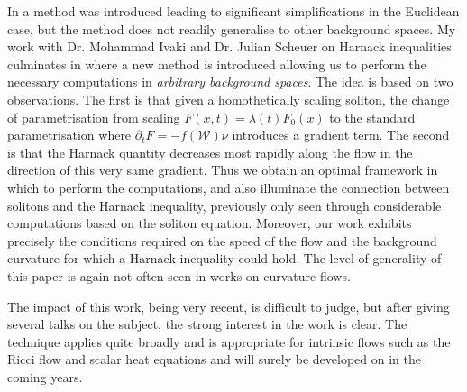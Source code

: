 \documentclass[12pt]{amsart}
\begin{document}
In \cite{MR1296393} a method was introduced leading to significant simplifications in the Euclidean case, but the method does not readily generalise to other background spaces. My work with Dr. Mohammad Ivaki and Dr. Julian Scheuer on Harnack inequalities culminates in \cite{BIS4} where a new method is introduced allowing us to perform the necessary computations in \emph{arbitrary background spaces}. The idea is based on two observations. The first is that given a homothetically scaling soliton, the change of parametrisation from scaling $F(x, t) = \lambda(t) F_0(x)$ to the standard parametrisation where $\partial_t F = -f(\mathcal{W})\nu$ introduces a gradient term. The second is that the Harnack quantity decreases most rapidly along the flow in the direction of this very same gradient. Thus we obtain an optimal framework in which to perform the computations, and also illuminate the connection between solitons and the Harnack inequality, previously only seen through considerable computations based on the soliton equation. Moreover, our work exhibits precisely the conditions required on the speed of the flow and the background curvature for which a Harnack inequality could hold. The level of generality of this paper is again not often seen in works on curvature flows.

The impact of this work, being very recent, is difficult to judge, but after giving several talks on the subject, the strong interest in the work is clear. The technique applies quite broadly and is appropriate for intrinsic flows such as the Ricci flow and scalar heat equations and will surely be developed on in the coming years.
\end{document}

